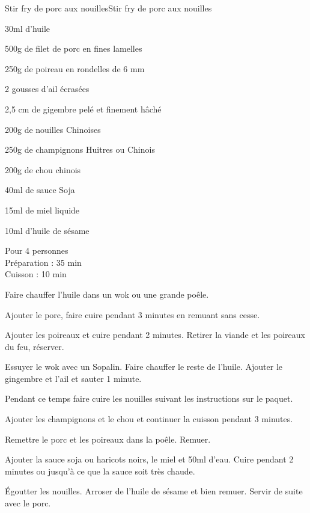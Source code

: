 \begin{recette}{Stir fry de porc aux nouilles}{Stir fry de porc aux nouilles}

\begin{ingredients}
30ml d'huile\par
500g de filet de porc en fines lamelles\par
250g de poireau en rondelles de 6 mm\par
2 gousses d'ail écrasées\par
2,5 cm de gigembre pelé et finement hâché\par
200g de nouilles Chinoises\par
250g de champignons Huitres ou Chinois\par
200g de chou chinois\par
40ml de sauce Soja\par
15ml de miel liquide\par
10ml d'huile de sésame\par
\end{ingredients}

\begin{infos}
Pour 4 personnes\\
Préparation : 35 min\\
Cuisson : 10 min\\
\end{infos}

\begin{etapes}
\item Faire chauffer l'huile dans un wok ou une grande poêle.
\item Ajouter le porc, faire cuire pendant 3 minutes en remuant sans cesse.
\item Ajouter les poireaux et cuire pendant 2 minutes. Retirer la viande et les poireaux du feu, réserver.
\item Essuyer le wok avec un Sopalin. Faire chauffer le reste de l'huile. Ajouter le gingembre et l'ail et sauter 1 minute.
\item Pendant ce temps faire cuire les nouilles suivant les instructions sur le paquet.
\item Ajouter les champignons et le chou et continuer la cuisson pendant 3 minutes.
\item Remettre le porc et les poireaux dans la poêle. Remuer.
\item Ajouter la sauce soja ou haricots noirs, le miel et 50ml d'eau. Cuire pendant 2 minutes ou jusqu'à ce que la sauce soit très chaude.
\item Égoutter les nouilles. Arroser de l'huile de sésame et bien remuer. Servir de suite avec le porc.
\end{etapes}

\end{recette}